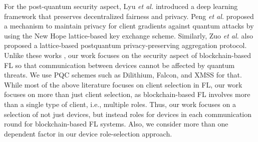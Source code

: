 For the post-quantum security aspect, 
 Lyu \textit{et al.} \cite{fairPrivacyPreservingFL} introduced a deep learning framework that preserves decentralized fairness and
privacy.
Peng \textit{et al.} \cite{LatticeBasedFederatedLearning} proposed
a mechanism to maintain privacy for client gradients against quantum attacks by using the New
Hope lattice-based key exchange scheme.
 Similarly, Zuo \textit{et al.} \cite{PrivacyPreservingAggregationFLLattic} also proposed a lattice-based postquantum privacy-preserving aggregation protocol.
 Unlike these works \cite{fairPrivacyPreservingFL, LatticeBasedFederatedLearning, PrivacyPreservingAggregationFLLattic}, our work focuses on the security aspect of blockchain-based FL so that communication between devices cannot be affected by quantum threats.
We use PQC schemes such as Dilithium, Falcon, and XMSS for that.
While most of the above literature focuses on client selection in FL, our work focuses on more
than just client selection, as blockchain-based FL involves more than a single type of client, i.e., multiple roles.
Thus, our work focuses on a selection of not just devices, but instead roles for devices in each communication round for blockchain-based FL systems. 
Also, we consider more than one dependent factor in our device role-selection approach.
